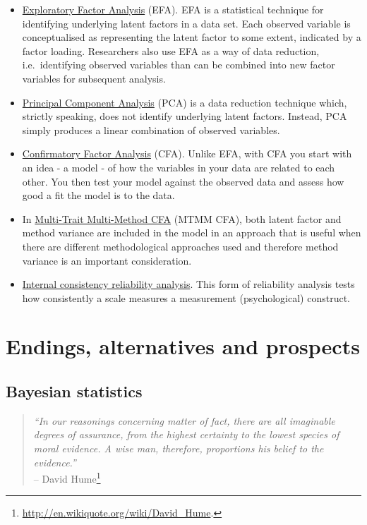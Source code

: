 \documentclass[
  a4paper,
]{book}
\begin{document}
\begin{itemize}
\item
  \protect\hyperlink{exploratory-factor-analysis}{Exploratory Factor
  Analysis} (EFA). EFA is a statistical technique for identifying
  underlying latent factors in a data set. Each observed variable is
  conceptualised as representing the latent factor to some extent,
  indicated by a factor loading. Researchers also use EFA as a way of
  data reduction, i.e.~identifying observed variables than can be
  combined into new factor variables for subsequent analysis.
\item
  \protect\hyperlink{principal-component-analysis}{Principal Component
  Analysis} (PCA) is a data reduction technique which, strictly
  speaking, does not identify underlying latent factors. Instead, PCA
  simply produces a linear combination of observed variables.
\item
  \protect\hyperlink{confirmatory-factor-analysis}{Confirmatory Factor
  Analysis} (CFA). Unlike EFA, with CFA you start with an idea - a model
  - of how the variables in your data are related to each other. You
  then test your model against the observed data and assess how good a
  fit the model is to the data.
\item
  In \protect\hyperlink{multi-trait-multi-method-cfa}{Multi-Trait
  Multi-Method CFA} (MTMM CFA), both latent factor and method variance
  are included in the model in an approach that is useful when there are
  different methodological approaches used and therefore method variance
  is an important consideration.
\item
  \protect\hyperlink{sec-Internal-consistency-reliability-analysis}{Internal
  consistency reliability analysis}. This form of reliability analysis
  tests how consistently a scale measures a measurement (psychological)
  construct.
\end{itemize}

\part{Endings, alternatives and prospects}

\hypertarget{sec-Bayesian-statistics}{%
\chapter{Bayesian statistics}\label{sec-Bayesian-statistics}}

\begin{quote}
\emph{``In our reasonings concerning matter of fact, there are all
imaginable degrees of assurance, from the highest certainty to the
lowest species of moral evidence. A wise man, therefore, proportions his
belief to the evidence.''}\\
-- David Hume\footnote{\url{http://en.wikiquote.org/wiki/David_Hume}.}
\end{quote}
\end{document}
